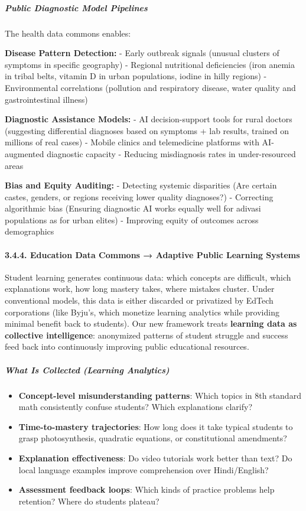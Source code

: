 \subparagraph{Public Diagnostic Model
Pipelines}\label{public-diagnostic-model-pipelines}

The health data commons enables:

\textbf{Disease Pattern Detection:} - Early outbreak signals (unusual
clusters of symptoms in specific geography) - Regional nutritional
deficiencies (iron anemia in tribal belts, vitamin D in urban
populations, iodine in hilly regions) - Environmental correlations
(pollution and respiratory disease, water quality and gastrointestinal
illness)

\textbf{Diagnostic Assistance Models:} - AI decision-support tools for
rural doctors (suggesting differential diagnoses based on symptoms + lab
results, trained on millions of real cases) - Mobile clinics and
telemedicine platforms with AI-augmented diagnostic capacity - Reducing
misdiagnosis rates in under-resourced areas

\textbf{Bias and Equity Auditing:} - Detecting systemic disparities (Are
certain castes, genders, or regions receiving lower quality diagnoses?)
- Correcting algorithmic bias (Ensuring diagnostic AI works equally well
for adivasi populations as for urban elites) - Improving equity of
outcomes across demographics

\paragraph{3.4.4. Education Data Commons → Adaptive Public Learning
Systems}\label{education-data-commons-adaptive-public-learning-systems}

Student learning generates continuous data: which concepts are
difficult, which explanations work, how long mastery takes, where
mistakes cluster. Under conventional models, this data is either
discarded or privatized by EdTech corporations (like Byju's, which
monetize learning analytics while providing minimal benefit back to
students). Our new framework treats \textbf{learning data as collective
intelligence}: anonymized patterns of student struggle and success feed
back into continuously improving public educational resources.

\subparagraph{What Is Collected (Learning
Analytics)}\label{what-is-collected-learning-analytics}

\begin{itemize}
\tightlist
\item
  \textbf{Concept-level misunderstanding patterns}: Which topics in 8th
  standard math consistently confuse students? Which explanations
  clarify?
\item
  \textbf{Time-to-mastery trajectories}: How long does it take typical
  students to grasp photosynthesis, quadratic equations, or
  constitutional amendments?
\item
  \textbf{Explanation effectiveness}: Do video tutorials work better
  than text? Do local language examples improve comprehension over
  Hindi/English?
\item
  \textbf{Assessment feedback loops}: Which kinds of practice problems
  help retention? Where do students plateau?
\end{itemize}


